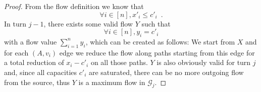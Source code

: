 \begin{proof}
  From the flow definition we know that
  \begin{equation}
  \label{saturation:flowleqcap}
    \forall i \in [n], x'_i \leq c'_i \enspace.
  \end{equation}
  In turn $j-1$, there exists some valid flow $Y$ such that
  \begin{equation*}
    \forall i \in [n], y_i = c'_i
  \end{equation*}
  with a flow value $\sum\limits_{i=1}^{n}y_i$, which can be created as follows: We start from $X$ and for each
  $\left(A, v_i\right)$ edge we reduce the flow along paths starting from this edge for a total reduction of $x_i - c'_i$ on
  all those paths. $Y$ is also obviously valid for turn $j$ and, since all capacities $c'_i$ are saturated, there can
  be no more outgoing flow from the source, thus $Y$ is a maximum flow in $\mathcal{G}_j$.
\end{proof}
